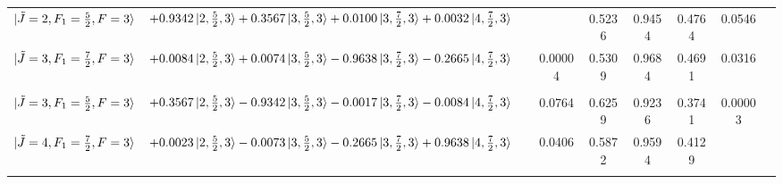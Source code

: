 \documentclass[8pt]{article}
\begin{document}
\begin{table}[]
\begin{tabular}{l l c c c c c c r}
		 $\ket{\tilde{J}  = 2, F_1 = \frac{5}{2}, F = 3}$ & $+0.9342\ket{2,\frac{5}{2},3} + 0.3567\ket{3,\frac{5}{2},3} +0.0100\ket{3,\frac{7}{2},3} +0.0032\ket{4,\frac{7}{2},3}$ & & & 0.5236 & 0.9454 & 0.4764 & 0.0546 &  \\
		 
		 $\ket{\tilde{J}  = 3, F_1 = \frac{7}{2}, F = 3}$ & $+0.0084\ket{2,\frac{5}{2},3} + 0.0074\ket{3,\frac{5}{2},3} -0.9638\ket{3,\frac{7}{2},3} -0.2665\ket{4,\frac{7}{2},3}$  & & 0.00004 & 0.5309 & 0.9684 & 0.4691 & 0.0316 &  \\  \\
		 
		 $\ket{\tilde{J}  = 3, F_1 = \frac{5}{2}, F = 3}$ & $+0.3567\ket{2,\frac{5}{2},3} - 0.9342\ket{3,\frac{5}{2},3} -0.0017\ket{3,\frac{7}{2},3} -0.0084\ket{4,\frac{7}{2},3}$ & & 0.0764 & 0.6259 & 0.9236 & 0.3741 & 0.00003 &  \\
		 
		 $\ket{\tilde{J}  = 4, F_1 = \frac{7}{2}, F = 3}$ & $+0.0023\ket{2,\frac{5}{2},3} - 0.0073\ket{3,\frac{5}{2},3} -0.2665\ket{3,\frac{7}{2},3} +0.9638\ket{4,\frac{7}{2},3}$ & & 0.0406 & 0.5872 & 0.9594 & 0.4129 & &  \\
		 \\
		 \hline
		 \hline
	\end{tabular}
\end{table}
\end{document}
